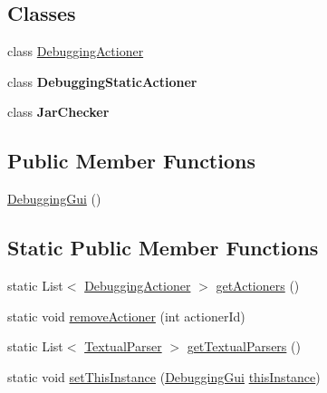 \subsection*{Classes}
\begin{DoxyCompactItemize}
\item 
class \hyperlink{classit_1_1emarolab_1_1cagg_1_1debugging_1_1DebuggingGui_1_1DebuggingActioner}{Debugging\-Actioner}
\item 
class {\bfseries Debugging\-Static\-Actioner}
\item 
class {\bfseries Jar\-Checker}
\end{DoxyCompactItemize}
\subsection*{Public Member Functions}
\begin{DoxyCompactItemize}
\item 
\hyperlink{classit_1_1emarolab_1_1cagg_1_1debugging_1_1DebuggingGui_a9b2ad684af84aa7e01d3bf3044a2421a}{Debugging\-Gui} ()
\end{DoxyCompactItemize}
\subsection*{Static Public Member Functions}
\begin{DoxyCompactItemize}
\item 
static List$<$ \hyperlink{classit_1_1emarolab_1_1cagg_1_1debugging_1_1DebuggingGui_1_1DebuggingActioner}{Debugging\-Actioner} $>$ \hyperlink{classit_1_1emarolab_1_1cagg_1_1debugging_1_1DebuggingGui_a494775d283c7a5dfc92062f39ffa9666}{get\-Actioners} ()
\item 
static void \hyperlink{classit_1_1emarolab_1_1cagg_1_1debugging_1_1DebuggingGui_a0ab0a479d0582c6009b4351abbef7860}{remove\-Actioner} (int actioner\-Id)
\item 
static List$<$ \hyperlink{classit_1_1emarolab_1_1cagg_1_1core_1_1language_1_1parser_1_1TextualParser}{Textual\-Parser} $>$ \hyperlink{classit_1_1emarolab_1_1cagg_1_1debugging_1_1DebuggingGui_a4fc06fd27c399fb81db55468350b4661}{get\-Textual\-Parsers} ()
\item 
static void \hyperlink{classit_1_1emarolab_1_1cagg_1_1debugging_1_1DebuggingGui_a2d8ca181d1a3846ddc0c6109e41cfd9e}{set\-This\-Instance} (\hyperlink{classit_1_1emarolab_1_1cagg_1_1debugging_1_1DebuggingGui}{Debugging\-Gui} \hyperlink{classit_1_1emarolab_1_1cagg_1_1debugging_1_1DebuggingGui_a9acdcdcb31dcfc0a1d1eca767a953620}{this\-Instance})
\end{DoxyCompactItemize}
